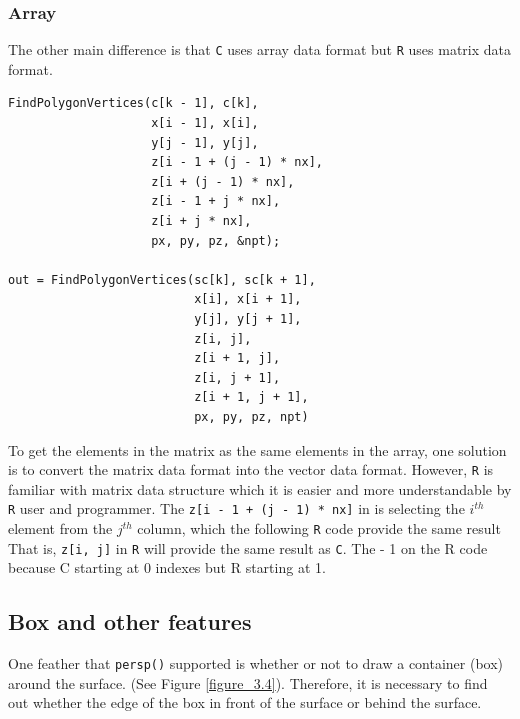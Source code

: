 \documentclass[11pt,twoside]{report}
\begin{document}
\subsubsection{Array}
The other main difference is that \texttt{C} uses array data format but \texttt{R} uses matrix data format. 
\begin{lstlisting}
FindPolygonVertices(c[k - 1], c[k],
                    x[i - 1], x[i],
                    y[j - 1], y[j],
                    z[i - 1 + (j - 1) * nx],
                    z[i + (j - 1) * nx],
                    z[i - 1 + j * nx],
                    z[i + j * nx],
                    px, py, pz, &npt);

out = FindPolygonVertices(sc[k], sc[k + 1],
                          x[i], x[i + 1],
                          y[j], y[j + 1],
                          z[i, j],
                          z[i + 1, j],
                          z[i, j + 1],
                          z[i + 1, j + 1],
                          px, py, pz, npt)
\end{lstlisting}



To get the elements in the matrix as the same elements in the array, one solution is to convert the matrix data format into the vector data format. However, \texttt{R} is familiar with matrix data structure which it is easier and more understandable by \texttt{R} user and programmer. The \texttt{z[i - 1 + (j - 1) * nx]} in  is selecting the $i^{th}$ element from the $j^{th}$ column, which the following \texttt{R} code provide the same result That is, \texttt{z[i, j]} in \texttt{R} will provide the same result as \texttt{C}. The - 1 on the R code because C starting at 0 indexes but R starting at 1.


\subsection{Box and other features}
One feather that \texttt{persp()} supported is whether or not to draw a container (box) around the surface. (See Figure \ref{figure_3.4}). Therefore, it is necessary to find out whether the edge of the box in front of the surface or behind the surface. \\ 
\end{document}
